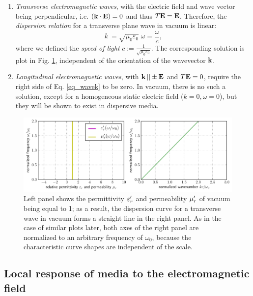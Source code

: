 \begin{enumerate}
 \item{\textit{Transverse electromagnetic waves}, with the electric field and wave vector being perpendicular, i.e. $({\mathbf{k}} \cdot \mathbf{E}) = 0$ and thus $T\mathbf{E} = \mathbf{E}$. Therefore, the \textit{dispersion relation} for a transverse plane wave in vacuum is linear:
\begin{equation} k~= \sqrt{\mu_0 \varepsilon_0}\; \omega = \frac{\omega}{c}, \label{eq_dispeq_vac}\end{equation}
where we defined the \textit{speed of light} $c := \frac{1}{\sqrt{\mu_0 \varepsilon_0}}$. The corresponding solution is plot in Fig. \ref{fg_dcvac}, independent of the orientation of the wavevector ${\mathbf{k}}$.
} 
 \item{\textit{Longitudinal electromagnetic waves}, with ${\mathbf{k}}\,|| \pm \mathbf{E}$ and $T\mathbf{E} = 0$, require the right side of Eq. \ref{eq_wavek} to be zero. In vacuum, there is no such a solution, except for a homogeneous static electric field ($k = 0, \omega = 0$), but they will be shown to exist in dispersive media.} 
 \end{enumerate}
 \begin{figure}[t] \caption{Left panel shows the permittivity $\varepsilon_r'$ and permeability $\mu_r'$ of vacuum being equal to 1; as a result, the dispersion curve for a transverse wave in vacuum forms a straight line in the right panel. As in the case of similar plots later, both axes of the right panel are normalized to an arbitrary frequency of $\omega_0$, because the characteristic curve shapes are independent of the scale.} \label{fg_dcvac} \centering  %
	\includegraphics[width=17cm]{img/dispersion_landau_lifshitz/dispersion_vacuum.pdf}
\end{figure}

\subsection{Local response of media to the electromagnetic field} \label{loc_response_of_media}
